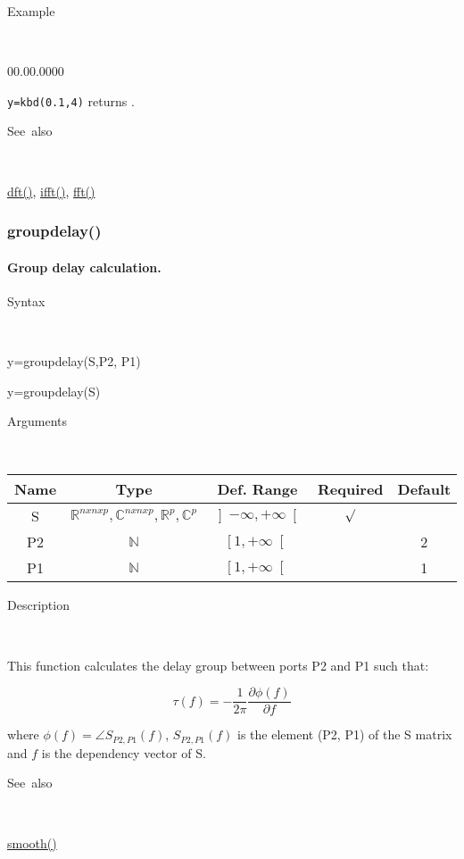 \begin{description}
\item [Example]~
\end{description}
\begin{lyxlist}{00.00.0000}
\item [\texttt{y=kbd(0.1,4)}]returns .
\end{lyxlist}
\begin{description}
\item [See~also]~
\end{description}
\textcolor{blue}{\hyperlink{dft}{dft()}}\textcolor{black}{,} \textcolor{blue}{\hyperlink{ifft}{ifft()}}\textcolor{black}{,}
\textcolor{blue}{\hyperlink{fft}{fft()}}

\newpage
\subsubsection*{\hypertarget{groupdelay}{}{\Large groupdelay()}}
\paragraph{\label{par:groupdelay}Group delay calculation.}

\begin{description}
\item [Syntax]~
\end{description}
y=groupdelay(S,P2, P1)

y=groupdelay(S)

\begin{description}
\item [Arguments]~
\end{description}
\begin{tabular}{|c|c|c|c|c|}
\hline 
Name&
Type&
Def. Range&
Required&
Default\tabularnewline
\hline
\hline 
S&
$\mathbb{R}^{nxnxp}, \mathbb{C}^{nxnxp}, \mathbb{R}^{p}, \mathbb{C}^{p}$&
$\left]-\infty,+\infty\right[$&
$\surd$&
\tabularnewline
\hline 
P2&
$\mathbb{N}$&
$\left[1,+\infty\right[$&
&
2\tabularnewline
\hline 
P1&
$\mathbb{N}$&
$\left[1,+\infty\right[$&
&
1\tabularnewline
\hline
\end{tabular}

\begin{description}
\item [Description]~
\end{description}
This function calculates the delay group between ports P2 and P1 such that:

\begin{equation}
  \tau(f) =  -\frac{1}{2 \pi}\frac{\partial \phi(f)}{\partial f}
\end{equation}

where $\phi(f) = \angle S_{P2, P1}(f)$, $S_{P2, P1}(f)$ is the element (P2, P1) of the S matrix and $f$ is the dependency vector of S.

\begin{description}
\item [See~also]~
\end{description}
\textcolor{blue}{\hyperlink{smooth}{smooth()}}
